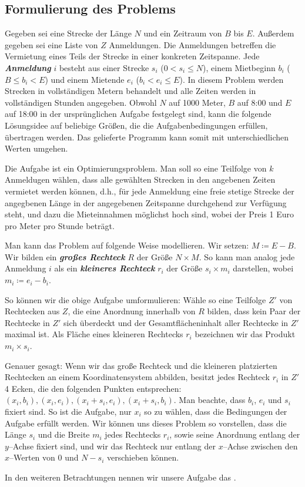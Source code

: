 \subsection{Formulierung des Problems}\label{sec:definitionen}
Gegeben sei eine Strecke der Länge $N$ und ein Zeitraum von $B$ bis $E$.
Außerdem gegeben sei eine Liste von $Z$ Anmeldungen. 
Die Anmeldungen betreffen die Vermietung eines Teils der Strecke in einer konkreten Zeitspanne.
Jede \textbf{\textit{Anmeldung}} $i$ besteht aus einer Strecke $s_i$ ($0 < s_i \leqslant N$),
einem Mietbeginn $b_i$ ($B \leqslant b_i < E$) und einem Mietende $e_i$ ($b_i < e_i \leqslant E$).
In diesem Problem werden Strecken in vollständigen Metern behandelt 
und alle Zeiten werden in vollständigen Stunden angegeben.
Obwohl $N$ auf 1000 Meter, $B$ auf 8:00 und $E$ auf 18:00 in der ursprünglichen Aufgabe festgelegt sind,
kann die folgende Lösungsidee auf beliebige Größen, die die Aufgabenbedingungen erfüllen, übertragen werden.
Das gelieferte Programm kann somit mit unterschiedlichen Werten umgehen.

Die Aufgabe ist ein Optimierungsproblem.
Man soll so eine Teilfolge von $k$ Anmeldugen wählen,
dass alle gewählten Strecken in den angebenen Zeiten vermietet werden können, d.h.,
für jede Anmeldung eine freie stetige Strecke der angegbenen Länge 
in der angegebenen Zeitspanne durchgehend zur Verfügung steht,
und dazu die Mieteinnahmen möglichst hoch sind, wobei der Preis 1 Euro pro Meter pro Stunde beträgt.

Man kann das Problem auf folgende Weise modellieren. 
Wir setzen: $M \coloneqq E - B$.
Wir bilden ein \textit{\textbf{großes Rechteck}} $R$ der Größe $N \times M$.
So kann man analog jede Anmeldung $i$ als ein \textit{\textbf{kleineres Rechteck}}
$r_i$ der Größe $s_i \times m_i$ darstellen, wobei $m_i \coloneqq e_i - b_i$.

So können wir die obige Aufgabe umformulieren:
Wähle so eine Teilfolge $Z'$ von Rechtecken aus $Z$,
die eine Anordnung innerhalb von $R$ bilden,
dass kein Paar der Rechtecke in $Z'$ sich überdeckt und
der Gesamtflächeninhalt aller Rechtecke in $Z'$ maximal ist.
Als Fläche eines kleineren Rechtecks $r_i$ bezeichnen wir das Produkt $m_i \times s_i$.

Genauer gesagt: Wenn wir das große Rechteck und die kleineren platzierten Rechtecken
an einem Koordinatensystem abbilden,
besitzt jedes Rechteck $r_i$ in $Z'$ 4 Ecken,
die den folgenden Punkten entsprechen:
$(x_i, b_i), (x_i, e_i), (x_i + s_i, e_i), (x_i + s_i, b_i)$.
Man beachte, dass $b_i$, $e_i$ und $s_i$ fixiert sind. 
So ist die Aufgabe, nur $x_i$ so zu wählen, dass die Bedingungen der Aufgabe erfüllt werden.
Wir können uns dieses Problem so vorstellen, dass die Länge $s_i$ und die Breite $m_i$
jedes Rechtecks $r_i$, sowie seine Anordnung entlang der $y$--Achse fixiert sind,
und wir das Rechteck nur entlang der $x$--Achse zwischen den $x$--Werten von 0 und $N-s_i$ verschieben können.

In den weiteren Betrachtungen nennen wir unsere Aufgabe das \fp.